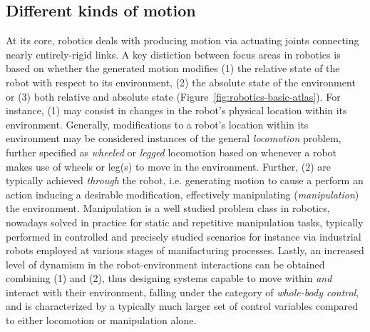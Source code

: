 \subsection{Different kinds of motion} 
At its core, robotics deals with producing motion via actuating joints connecting nearly entirely-rigid links. 
A key distiction between focus areas in robotics is based on whether the generated motion modifies (1) the relative state of the robot with respect to its environment, (2) the absolute state of the environment or (3) both relative and absolute state (Figure~\ref{fig:robotics-basic-atlas}).
For instance, (1) may consist in changes in the robot's physical location within its environment. 
Generally, modifications to a robot's location within its environment may be considered instances of the general \emph{locomotion} problem, further specified as \emph{wheeled} or \emph{legged} locomotion based on whenever a robot makes use of wheels or leg(s) to move in the environment.
Further, (2) are typically achieved \emph{through} the robot, i.e. generating motion to cause a perform an action inducing a desirable modification, effectively manipulating (\emph{manipulation}) the environment. 
Manipulation is a well studied problem class in robotics, nowadays solved in practice for static and repetitive manipulation tasks, typically performed in controlled and precisely studied scenarios for instance via industrial robots employed at various stages of manifacturing processes.
Lastly, an increased level of dynamism in the robot-environment interactions can be obtained combining (1) and (2), thus designing systems capable to move within \emph{and} interact with their environment, falling under the category of \emph{whole-body control}, and is characterized by a typically much larger set of control variables compared to either locomotion or manipulation alone.


